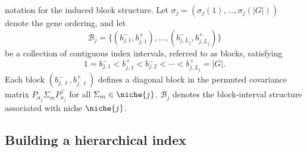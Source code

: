 \documentclass[pdflatex,sn-mathphys-num]{sn-jnl}%
\theoremstyle{thmstyleone}%
\theoremstyle{thmstyletwo}%
\theoremstyle{thmstylethree}%
\begin{document}
notation for the induced block structure. Let $\sigma_j = (\sigma_j(1),\dots,\sigma_j(|G|))$
denote the gene ordering, and let
\[
\mathcal{B}_j
= \{(b_{j,1}^{-}, b_{j,1}^{+}),\dots,(b_{j,L_j}^{-}, b_{j,L_j}^{+})\}
\]
be a collection of contiguous index intervals, referred to as blocks, satisfying
\[
1 = b_{j,1}^{-} < b_{j,1}^{+} < b_{j,2}^{-} < \cdots < b_{j,L_j}^{+} = |G|.
\]
Each block $(b_{j,\ell}^{-}, b_{j,\ell}^{+})$ defines a diagonal block in the permuted
covariance matrix $P_{\sigma_j}\Sigma_m P_{\sigma_j}^{\top}$ for all
$\Sigma_m \in \niche{j}$. $\mathcal{B}_j$ denotes the block-interval structure
associated with niche $\niche{j}$. 







\subsection{Building a hierarchical index}
%
\end{document}
